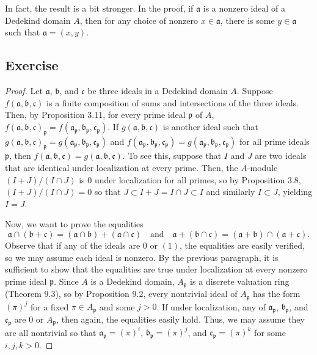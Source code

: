 \begin{remark}
In fact, the result is a bit stronger. In the proof, if $\mathfrak{a}$ is a nonzero ideal of a Dedekind domain $A$, then for any choice of nonzero $x \in \mathfrak{a}$,
there is some $y \in \mathfrak{a}$ such that $\mathfrak{a} = (x,y)$.
\end{remark}

\subsection{Exercise}\label{9.8}

\begin{proof}
Let $\mathfrak{a}$, $\mathfrak{b}$, and $\mathfrak{c}$ be three ideals in a Dedekind domain $A$. Suppose $f(\mathfrak{a},\mathfrak{b},\mathfrak{c})$
is a finite composition of sums and intersections of the three ideals. Then, by Proposition 3.11, for every prime ideal $\mathfrak{p}$ of $A$,
$f(\mathfrak{a},\mathfrak{b},\mathfrak{c})_{\mathfrak{p}} = f(\mathfrak{a}_{\mathfrak{p}},\mathfrak{b}_{\mathfrak{p}},\mathfrak{c}_{\mathfrak{p}})$.
If $g(\mathfrak{a},\mathfrak{b},\mathfrak{c})$ is another ideal such that 
$g(\mathfrak{a},\mathfrak{b},\mathfrak{c})_{\mathfrak{p}} = g(\mathfrak{a}_{\mathfrak{p}},\mathfrak{b}_{\mathfrak{p}},\mathfrak{c}_{\mathfrak{p}})$
and $f(\mathfrak{a}_{\mathfrak{p}},\mathfrak{b}_{\mathfrak{p}},\mathfrak{c}_{\mathfrak{p}}) = g(\mathfrak{a}_{\mathfrak{p}},\mathfrak{b}_{\mathfrak{p}},\mathfrak{c}_{\mathfrak{p}})$
for all prime ideals $\mathfrak{p}$, then $f(\mathfrak{a},\mathfrak{b},\mathfrak{c}) = g(\mathfrak{a},\mathfrak{b},\mathfrak{c})$.
To see this, suppose that $I$ and $J$ are two ideals that are identical under localization at every prime. Then, the $A$-module $(I + J)/(I \cap J)$ 
is $0$ under localization for all primes, so by Proposition 3.8, $(I + J)/(I \cap J) = 0$ so that $J \subset I + J = I \cap J \subset I$ and similarly 
$I \subset J$, yielding $I = J$.

Now, we want to prove the equalities
$$\mathfrak{a} \cap (\mathfrak{b} + \mathfrak{c}) = (\mathfrak{a} \cap \mathfrak{b}) + (\mathfrak{a} \cap \mathfrak{c}) 
\quad\text{and}\quad
\mathfrak{a} + (\mathfrak{b} \cap \mathfrak{c}) = (\mathfrak{a} + \mathfrak{b}) \cap (\mathfrak{a} + \mathfrak{c}).$$
Observe that if any of the ideals are $0$ or $(1)$, the equalities are easily verified, so we may assume each ideal is nonzero. 
By the previous paragraph, it is sufficient to show that the equalities are true under localization at every nonzero prime ideal 
$\mathfrak{p}$. Since $A$ is a Dedekind domain, $A_{\mathfrak{p}}$ is a discrete valuation ring (Theorem 9.3), so by Proposition 9.2, 
every nontrivial ideal of $A_{\mathfrak{p}}$ has the form $(\pi)^j$ for a fixed $\pi \in A_{\mathfrak{p}}$ and some $j > 0$. If under localization, 
any of $\mathfrak{a}_{\mathfrak{p}}$, $\mathfrak{b}_{\mathfrak{p}}$, and $\mathfrak{c}_{\mathfrak{p}}$ are $0$ or $A_{\mathfrak{p}}$, then again, 
the equalities easily hold. Thus, we may assume they are all nontrivial so that $\mathfrak{a}_{\mathfrak{p}} = (\pi)^i$, $\mathfrak{b}_{\mathfrak{p}} = (\pi)^j$,
and $\mathfrak{c}_{\mathfrak{p}} = (\pi)^k$ for some $i,j,k > 0$.


\end{proof}
